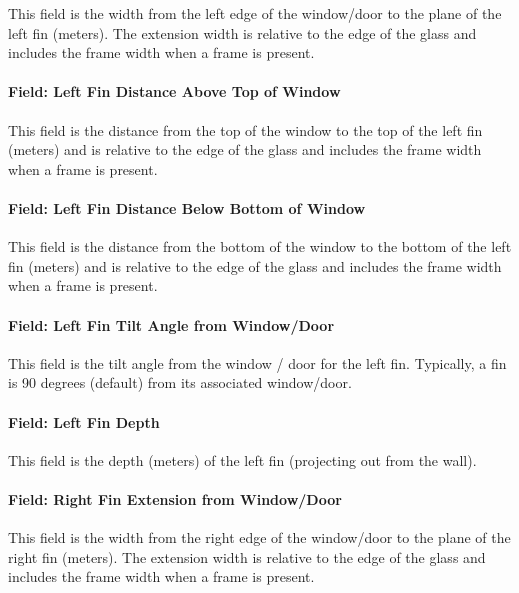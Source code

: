 This field is the width from the left edge of the window/door to the plane of the left fin (meters). The extension width is relative to the edge of the glass and includes the frame width when a frame is present.

\paragraph{Field: Left Fin Distance Above Top of Window}\label{field-left-fin-distance-above-top-of-window}

This field is the distance from the top of the window to the top of the left fin (meters) and is relative to the edge of the glass and includes the frame width when a frame is present.

\paragraph{Field: Left Fin Distance Below Bottom of Window}\label{field-left-fin-distance-below-bottom-of-window}

This field is the distance from the bottom of the window to the bottom of the left fin (meters) and is relative to the edge of the glass and includes the frame width when a frame is present.

\paragraph{Field: Left Fin Tilt Angle from Window/Door}\label{field-left-fin-tilt-angle-from-windowdoor}

This field is the tilt angle from the window / door for the left fin. Typically, a fin is 90 degrees (default) from its associated window/door.

\paragraph{Field: Left Fin Depth}\label{field-left-fin-depth}

This field is the depth (meters) of the left fin (projecting out from the wall).

\paragraph{Field: Right Fin Extension from Window/Door}\label{field-right-fin-extension-from-windowdoor}

This field is the width from the right edge of the window/door to the plane of the right fin (meters). The extension width is relative to the edge of the glass and includes the frame width when a frame is present.

